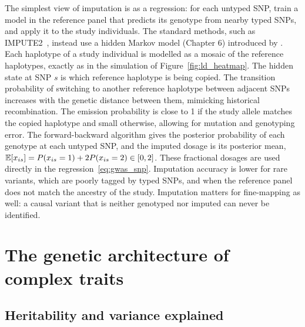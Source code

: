 The simplest view of imputation is as a regression: for each untyped SNP, train a model in the reference panel that predicts its genotype from nearby typed SNPs, and apply it to the study individuals. The standard methods, such as IMPUTE2~\citep{howie2009}, instead use a hidden Markov model (Chapter 6) introduced by \citet{li2003}. Each haplotype of a study individual is modelled as a mosaic of the reference haplotypes, exactly as in the simulation of Figure~\ref{fig:ld_heatmap}. The hidden state at SNP $s$ is which reference haplotype is being copied. The transition probability of switching to another reference haplotype between adjacent SNPs increases with the genetic distance between them, mimicking historical recombination. The emission probability is close to 1 if the study allele matches the copied haplotype and small otherwise, allowing for mutation and genotyping error. The forward-backward algorithm gives the posterior probability of each genotype at each untyped SNP, and the imputed dosage is its posterior mean, $\mathbb{E}[x_{is}]=P(x_{is}=1)+2P(x_{is}=2)\in[0,2]$. These fractional dosages are used directly in the regression~\eqref{eq:gwas_snp}. Imputation accuracy is lower for rare variants, which are poorly tagged by typed SNPs, and when the reference panel does not match the ancestry of the study. Imputation matters for fine-mapping as well: a causal variant that is neither genotyped nor imputed can never be identified.

\section{The genetic architecture of complex traits}
\label{sec:architecture}

\subsection{Heritability and variance explained}

